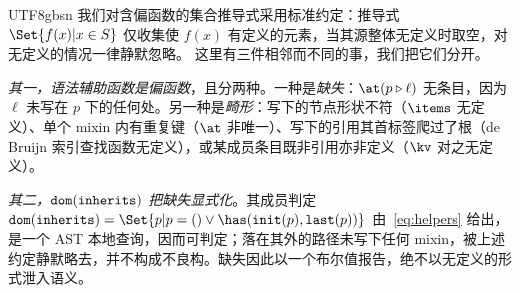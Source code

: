 \begin{CJK*}{UTF8}{gbsn}
\ifPaperChinese
我们对含偏函数的集合推导式采用标准约定：推导式 $\Set{ f(x) | x \in S }$
仅收集使 $f(x)$ 有定义的元素，当其源整体无定义时取空，对无定义的情况一律静默忽略。
这里有三件相邻而不同的事，我们把它们分开。

\emph{其一，语法辅助函数是偏函数}，且分两种。一种是\emph{缺失}：$\at(p \snoc \ell)$ 无条目，因为 $\ell$ 未写在 $p$ 下的任何处。另一种是\emph{畸形}：写下的节点形状不符（$\items$ 无定义）、单个 mixin 内有重复键（$\at$ 非唯一）、写下的引用其首标签爬过了根（de Bruijn 索引查找函数无定义），或某成员条目既非引用亦非定义（$\kv$ 对之无定义）。

\begin{sloppypar}
\emph{其二，$\mathtt{dom}(\mathtt{inherits})$ 把缺失显式化}。其成员判定 $\dom(\inherits) = \Set{ p | p = () \vee \has(\init(p), \last(p)) }$ 由~\eqref{eq:helpers} 给出，是一个 AST 本地查询，因而可判定；落在其外的路径未写下任何 mixin，被上述约定静默略去，并不构成不良构。缺失因此以一个布尔值报告，绝不以无定义的形式泄入语义。
\end{sloppypar}


\end{CJK*}
